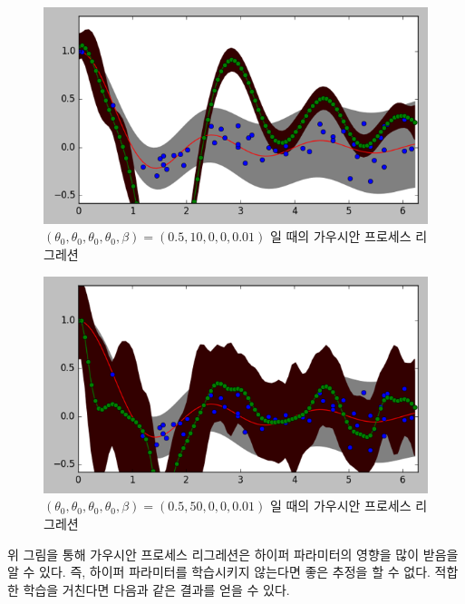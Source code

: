 \documentclass[a4paper]{oblivoir}
\begin{document}
\begin{figure}[ht] \centering 
\includegraphics[scale=0.6]{fig12_14.png} 
\caption{$(\theta_{0},\theta_{0},\theta_{0},\theta_{0}, \beta ) = (0.5,10,0,0,0.01)$ 일 때의 가우시안 프로세스 리그레션}
\label{fig:12-14}
\end{figure}

\begin{figure}[ht] \centering 
\includegraphics[scale=0.6]{fig12_15.png} 
\caption{$(\theta_{0},\theta_{0},\theta_{0},\theta_{0}, \beta ) = (0.5,50,0,0,0.01)$ 일 때의 가우시안 프로세스 리그레션}
\label{fig:12-15}
\end{figure}

위 그림을 통해 가우시안 프로세스 리그레션은 하이퍼 파라미터의 영향을 많이 받음을 알 수 있다. 즉, 하이퍼 파라미터를 학습시키지 않는다면 좋은 추정을 할 수 없다. 적합한 학습을 거친다면 다음과 같은 결과를 얻을 수 있다.\\
\end{document}
